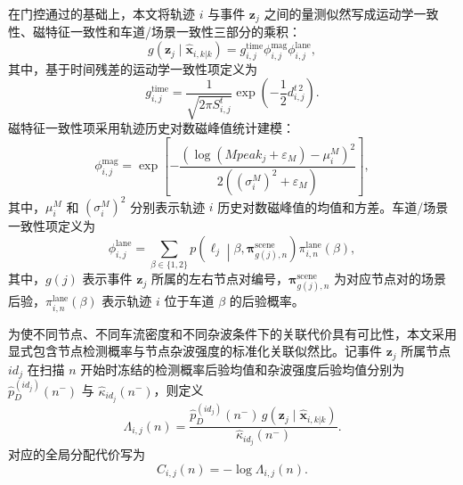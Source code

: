 \documentclass{xdupgthesis}
\begin{document}
在门控通过的基础上，本文将轨迹 $i$ 与事件 $\mathbf z_j$ 之间的量测似然写成运动学一致性、磁特征一致性和车道/场景一致性三部分的乘积：
\begin{equation}
	g(\mathbf z_j\mid \hat{\mathbf x}_{i,k|k})
	=
	g_{i,j}^{\mathrm{time}}
	\phi_{i,j}^{\mathrm{mag}}
	\phi_{i,j}^{\mathrm{lane}},
	\label{eq:ch3_total_likelihood}
\end{equation}
其中，基于时间残差的运动学一致性项定义为
\begin{equation}
	g_{i,j}^{\mathrm{time}}
	=
	\frac{1}{\sqrt{2\pi S^{t}_{i,j}}}
	\exp\left(-\frac{1}{2}d^{t\,2}_{i,j}\right).
	\label{eq:ch3_g_time}
\end{equation}
磁特征一致性项采用轨迹历史对数磁峰值统计建模：
\begin{equation}
	\phi_{i,j}^{\mathrm{mag}}
	=
	\exp\left[
	-\frac{
		\left(
		\log(Mpeak_j+\varepsilon_M)-\mu_i^{M}
		\right)^2
	}{
		2\left((\sigma_i^{M})^2+\varepsilon_M\right)
	}
	\right],
	\label{eq:ch3_phi_mag}
\end{equation}
其中，$\mu_i^{M}$ 和 $(\sigma_i^{M})^2$ 分别表示轨迹 $i$ 历史对数磁峰值的均值和方差。车道/场景一致性项定义为
\begin{equation}
	\phi_{i,j}^{\mathrm{lane}}
	=
	\sum_{\beta\in\{1,2\}}
	p\!\left(\ell_j\middle|\beta,\boldsymbol\pi_{g(j),n}^{\mathrm{scene}}\right)
	\pi_{i,n}^{\mathrm{lane}}(\beta),
	\label{eq:ch3_phi_lane}
\end{equation}
其中，$g(j)$ 表示事件 $\mathbf z_j$ 所属的左右节点对编号，$\boldsymbol\pi_{g(j),n}^{\mathrm{scene}}$ 为对应节点对的场景后验，$\pi_{i,n}^{\mathrm{lane}}(\beta)$ 表示轨迹 $i$ 位于车道 $\beta$ 的后验概率。

为使不同节点、不同车流密度和不同杂波条件下的关联代价具有可比性，本文采用显式包含节点检测概率与节点杂波强度的标准化关联似然比。记事件 $\mathbf z_j$ 所属节点 $id_j$ 在扫描 $n$ 开始时冻结的检测概率后验均值和杂波强度后验均值分别为 $\hat p_D^{(id_j)}(n^-)$ 与 $\hat\kappa_{id_j}(n^-)$，则定义
\begin{equation}
	\Lambda_{i,j}(n)
	=
	\frac{
		\hat p_D^{(id_j)}(n^-)\,
		g(\mathbf z_j\mid \hat{\mathbf x}_{i,k|k})
	}{
		\hat\kappa_{id_j}(n^-)
	}.
	\label{eq:ch3_assoc_ratio}
\end{equation}
对应的全局分配代价写为
\begin{equation}
	C_{i,j}(n)=-\log \Lambda_{i,j}(n).
	\label{eq:ch3_assoc_cost}
\end{equation}
\end{document}
